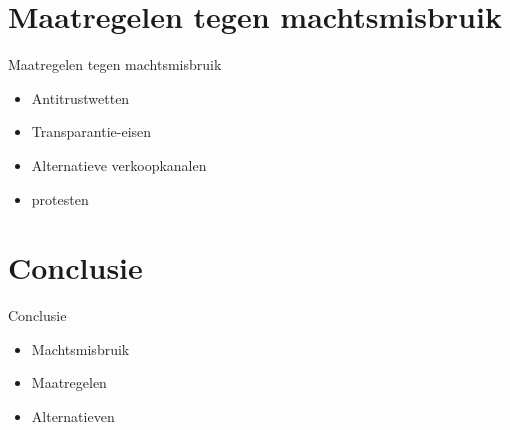 \documentclass{beamer}
\begin{document}
\section[Maatregelen]{Maatregelen tegen machtsmisbruik}
\begin{frame}{Maatregelen tegen machtsmisbruik}
    \begin{itemize}
        \item Antitrustwetten
        \item Transparantie-eisen
        \item Alternatieve verkoopkanalen
        \item protesten
    \end{itemize}
\end{frame}



\section{Conclusie}
\begin{frame}{Conclusie}
    \begin{itemize}
        \item Machtsmisbruik 
        \item Maatregelen
        \item Alternatieven 
    \end{itemize}
\end{frame}
\end{document}

